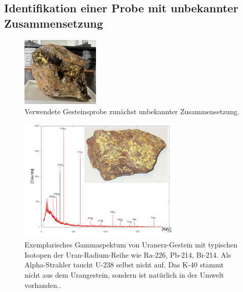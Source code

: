 \subsection{Identifikation einer Probe mit unbekannter Zusammensetzung}

\begin{figure}[H]
    \centering
    \includegraphics[width=0.33\textwidth]{content/grafik/unbekannt.jpg}
    \caption{Verwendete Gesteinsprobe zunächst unbekannter Zusammensetzung.}
    \label{fig:unbekannt}
\end{figure}

\begin{figure}[H]
    \centering
    \includegraphics[width=0.7\textwidth]{content/grafik/Gammaspektrum_Uranerz.jpg}
    \caption{Exemplarisches Gammaspektum von Uranerz-Gestein mit typischen Isotopen der Uran-Radium-Reihe
             wie Ra-226, Pb-214, Bi-214. Als Alpha-Strahler taucht U-238 selbst nicht auf. Das K-40 stammt
             nicht aus dem Urangestein, sondern ist natürlich in der Umwelt vorhanden.. \cite{gamma_uran}}
    \label{fig:SpekU}
\end{figure}

\cite{iaea_recom}

